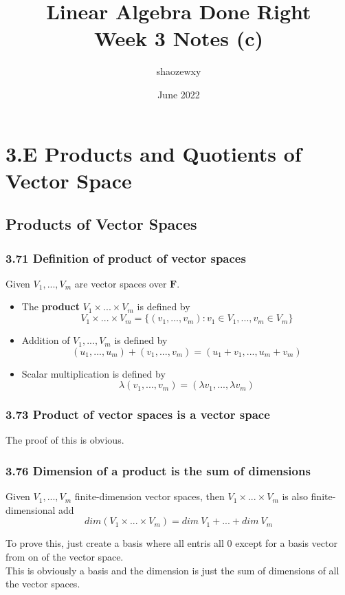 \documentclass{article}
\title{Linear Algebra Done Right\\
\large{Week 3 Notes (c)}}
\author{shaozewxy }
\date{June 2022}
\begin{document}
\maketitle

\setcounter{secnumdepth}{0}
\section*{3.E Products and Quotients of Vector Space}
\subsection*{Products of Vector Spaces}
\subsubsection*{3.71 Definition of product of vector spaces}
Given $V_1, ..., V_m$ are vector spaces over $\mathbf{F}$.
\begin{itemize}
    \item The \textbf{product} $V_1 \times ... \times V_m$ is defined by
    \begin{equation*}
        V_1 \times ... \times V_m = \{(v_1, ..., v_m): v_1 \in V_1, ..., v_m \in V_m\}
    \end{equation*}
    \item Addition of $V_1, ..., V_m$ is defined by
    \begin{equation*}
        (u_1, ..., u_m) + (v_1, ..., v_m) = (u_1 + v_1, ..., u_m + v_m)
    \end{equation*}
    \item Scalar multiplication is defined by
    \begin{equation*}
        \lambda(v_1, ..., v_m) = (\lambda v_1, ..., \lambda v_m)
    \end{equation*}
\end{itemize}
\subsubsection*{3.73 Product of vector spaces is a vector space}
The proof of this is obvious.
\subsubsection*{3.76 Dimension of a product is the sum of dimensions}
Given $V_1, ..., V_m$ finite-dimension vector spaces, then $V_1 \times ... \times V_m$ is also finite-dimensional add
\begin{equation*}
    dim(V_1 \times ... \times V_m) = dim\ V_1 + ... + dim\ V_m
\end{equation*}
\begin{addmargin}[1em]{0em}
    To prove this, just create a basis where all entris all $0$ except for a basis vector from on of the vector space.\\
    This is obviously a basis and the dimension is just the sum of dimensions of all the vector spaces.
\end{addmargin}
\end{document}
